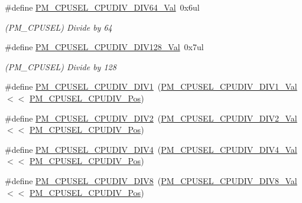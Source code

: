 \begin{DoxyCompactItemize}
\#define \mbox{\hyperlink{group___s_a_m_d21___p_m_ga10cdb3447b7fbd67caffd85316805abd}{P\+M\+\_\+\+C\+P\+U\+S\+E\+L\+\_\+\+C\+P\+U\+D\+I\+V\+\_\+\+D\+I\+V64\+\_\+\+Val}}~0x6ul
\begin{DoxyCompactList}\small\item\em (P\+M\+\_\+\+C\+P\+U\+S\+EL) Divide by 64 \end{DoxyCompactList}\item 
\#define \mbox{\hyperlink{group___s_a_m_d21___p_m_ga938d0dc17eb7f696a8a4b159bcd4721d}{P\+M\+\_\+\+C\+P\+U\+S\+E\+L\+\_\+\+C\+P\+U\+D\+I\+V\+\_\+\+D\+I\+V128\+\_\+\+Val}}~0x7ul
\begin{DoxyCompactList}\small\item\em (P\+M\+\_\+\+C\+P\+U\+S\+EL) Divide by 128 \end{DoxyCompactList}\item 
\#define \mbox{\hyperlink{group___s_a_m_d21___p_m_ga1c67bb03d1db064fb57a2e04e00bc5f9}{P\+M\+\_\+\+C\+P\+U\+S\+E\+L\+\_\+\+C\+P\+U\+D\+I\+V\+\_\+\+D\+I\+V1}}~(\mbox{\hyperlink{group___s_a_m_d21___p_m_ga1d79dfe939514654161cb9bfa85ba5b7}{P\+M\+\_\+\+C\+P\+U\+S\+E\+L\+\_\+\+C\+P\+U\+D\+I\+V\+\_\+\+D\+I\+V1\+\_\+\+Val}}     $<$$<$ \mbox{\hyperlink{group___s_a_m_d21___p_m_ga06001ff79ade30f0557224810a94c5e1}{P\+M\+\_\+\+C\+P\+U\+S\+E\+L\+\_\+\+C\+P\+U\+D\+I\+V\+\_\+\+Pos}})
\item 
\#define \mbox{\hyperlink{group___s_a_m_d21___p_m_ga3189a4a860a99e1076faaa356be53c1d}{P\+M\+\_\+\+C\+P\+U\+S\+E\+L\+\_\+\+C\+P\+U\+D\+I\+V\+\_\+\+D\+I\+V2}}~(\mbox{\hyperlink{group___s_a_m_d21___p_m_gac355a4c69da1a3a7c8f6620c72ce4786}{P\+M\+\_\+\+C\+P\+U\+S\+E\+L\+\_\+\+C\+P\+U\+D\+I\+V\+\_\+\+D\+I\+V2\+\_\+\+Val}}     $<$$<$ \mbox{\hyperlink{group___s_a_m_d21___p_m_ga06001ff79ade30f0557224810a94c5e1}{P\+M\+\_\+\+C\+P\+U\+S\+E\+L\+\_\+\+C\+P\+U\+D\+I\+V\+\_\+\+Pos}})
\item 
\#define \mbox{\hyperlink{group___s_a_m_d21___p_m_gad056689d66880962bda4d0b390d31fca}{P\+M\+\_\+\+C\+P\+U\+S\+E\+L\+\_\+\+C\+P\+U\+D\+I\+V\+\_\+\+D\+I\+V4}}~(\mbox{\hyperlink{group___s_a_m_d21___p_m_gadd0d3f140d80559ad0c76d011e521d87}{P\+M\+\_\+\+C\+P\+U\+S\+E\+L\+\_\+\+C\+P\+U\+D\+I\+V\+\_\+\+D\+I\+V4\+\_\+\+Val}}     $<$$<$ \mbox{\hyperlink{group___s_a_m_d21___p_m_ga06001ff79ade30f0557224810a94c5e1}{P\+M\+\_\+\+C\+P\+U\+S\+E\+L\+\_\+\+C\+P\+U\+D\+I\+V\+\_\+\+Pos}})
\item 
\#define \mbox{\hyperlink{group___s_a_m_d21___p_m_ga27e3df2ff882736b8c10ec869dd98dc4}{P\+M\+\_\+\+C\+P\+U\+S\+E\+L\+\_\+\+C\+P\+U\+D\+I\+V\+\_\+\+D\+I\+V8}}~(\mbox{\hyperlink{group___s_a_m_d21___p_m_gac6f31caf1947754f99d6c969a88565e0}{P\+M\+\_\+\+C\+P\+U\+S\+E\+L\+\_\+\+C\+P\+U\+D\+I\+V\+\_\+\+D\+I\+V8\+\_\+\+Val}}     $<$$<$ \mbox{\hyperlink{group___s_a_m_d21___p_m_ga06001ff79ade30f0557224810a94c5e1}{P\+M\+\_\+\+C\+P\+U\+S\+E\+L\+\_\+\+C\+P\+U\+D\+I\+V\+\_\+\+Pos}})

\end{DoxyCompactItemize}
